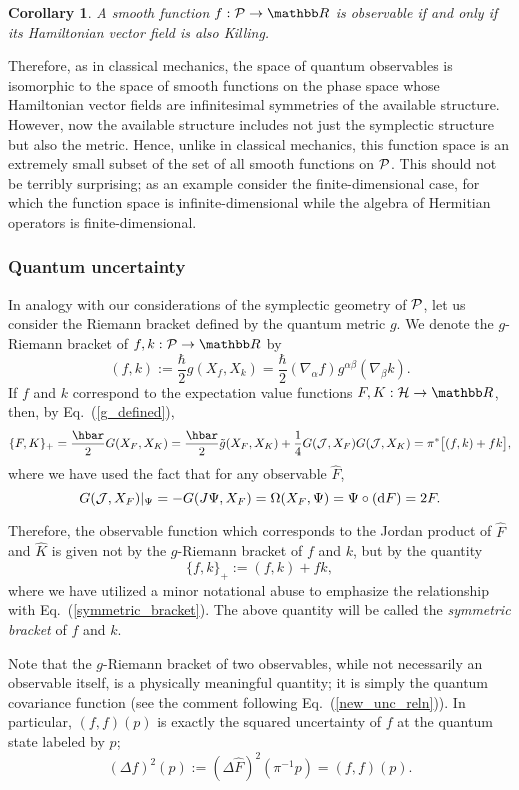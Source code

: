 \documentclass[12pt,aps,eqsecnum,tighten]{revtex4-2}
\def\be{\begin{equation}}
\def\ee{\end{equation}}
\def\a{\alpha}
\def\b{\beta}
\def\d{{\mathrm d}}
\def\grad{\nabla}
\def\H{{\cal H}}
\def\P{{\cal P}}
\def\W{\Omega}
\def\J{{\cal J}}
\newcommand{\eqn}[1]{Eq.~(\ref{#1})}
\newcommand{\hvf}[1]{{X_{#1}}}
\newtheorem{cor}{Corollary}
\def\R{\mathbb R}
\begin{document}
%
\begin{cor}
A smooth function $f:\P\rightarrow\R$ is observable if and only if its
Hamiltonian vector field is also Killing.
\end{cor}
%
Therefore, as in classical mechanics, the space of quantum observables
is isomorphic to the space of smooth functions on the phase space
whose Hamiltonian vector fields are infinitesimal symmetries of the
available structure.  However, now the available structure includes
not just the symplectic structure but also the metric. Hence, unlike
in classical mechanics, this function space is an extremely small
subset of the set of all smooth functions on $\P$.  This should not be
terribly surprising; as an example consider the finite-dimensional
case, for which the function space is infinite-dimensional while the
algebra of Hermitian operators is finite-dimensional.


\subsubsection{Quantum uncertainty}

In analogy with our considerations of the symplectic geometry of $\P$,
let us consider the Riemann bracket defined by the quantum metric $g$.
We denote the $g$-Riemann bracket of $f,k : \P \rightarrow \R$ by
%
\be
( f, k ) := \frac{\hbar}{2} g( \hvf{f}, \hvf{k} )
	  = \frac{\hbar}{2} (\grad_\a f) g^{\a\b} (\grad_\b k).
\ee
%
If $f$ and $k$ correspond to the expectation value functions
$F, K : \H \rightarrow \R$, then, by \eqn{g_defined},
%
\be
\{ F, K \}_+  = \frac{\hbar}{2} G( \hvf{F}, \hvf{K} )
= \frac{\hbar}{2} \tilde{g} ( \hvf{F}, \hvf{K})
+ \frac{1}{4} G( \J,\hvf{F} ) G( \J,\hvf{K} )
= \pi^* \big[ (f,k) + fk \big],
\ee
%
where we have used the fact that for any observable $\hat{F}$,
%
\be
G(\J, \hvf{F})|_\Psi = - G(J\Psi, \hvf{F}) 
= \W( \hvf{F}, \Psi ) = \Psi \circ (\d F) = 2F.
\ee
%

Therefore, the observable function which corresponds to the Jordan
product of $\hat{F}$ and $\hat{K}$ is given not by the $g$-Riemann
bracket of $f$ and $k$, but by the quantity
%
\be \label{symmetric_bracket2}
\{ f, k \}_+  := ( f, k) + fk,		
\ee
%
where we have utilized a minor notational abuse to emphasize the
relationship with \eqn{symmetric_bracket}.  The above quantity will be
called the {\em symmetric bracket} of $f$ and $k$.

Note that the $g$-Riemann bracket of two observables, while not
necessarily an observable itself, is a physically meaningful quantity;
it is simply the quantum covariance function (see the comment
following \eqn{new_unc_reln}).  In particular, $(f, f)(p)$ is exactly
the squared uncertainty of $f$ at the quantum state labeled by $p$;
%
\be \label{new_uncertainty}
(\Delta f)^2(p) := (\Delta \hat{F})^2(\pi^{-1}p) = (f, f)(p).
\ee
%
\end{document}
